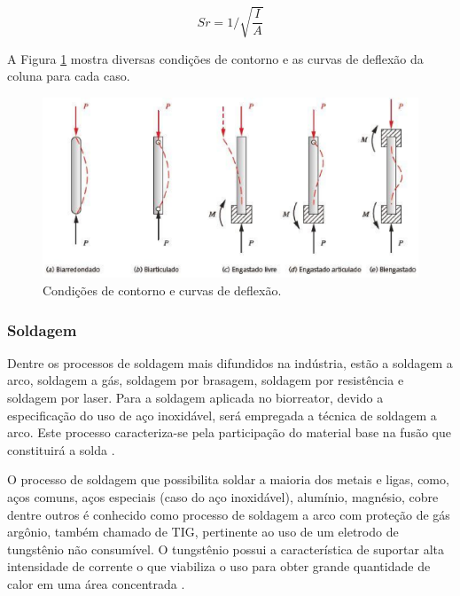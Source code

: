 \[Sr = 1/\sqrt{\frac{I}{A}}\]

A Figura \ref{solda} mostra diversas condições de contorno e as curvas de deflexão da coluna para cada caso.

\begin{figure}[h]
 \centering
 \includegraphics[keepaspectratio=true,scale=0.5]{figuras/solda.eps}
 \caption{Condições de contorno e curvas de deflexão.}
 \label{solda}
\end{figure}

\subsubsection{Soldagem}

Dentre os processos de soldagem mais difundidos na indústria, estão a soldagem a arco, soldagem a gás, soldagem por brasagem, soldagem por resistência e soldagem por laser. Para a soldagem aplicada no biorreator, devido a especificação do uso de aço inoxidável, será empregada a técnica de soldagem a arco. Este processo caracteriza-se pela participação do material base na fusão que constituirá a solda \cite{chiaverini1986tecnologia}.

O processo de soldagem que possibilita soldar a maioria dos metais e ligas, como, aços comuns, aços especiais (caso do aço inoxidável), alumínio, magnésio, cobre dentre outros é conhecido como processo de soldagem a arco com proteção de gás argônio, também chamado de TIG, pertinente ao uso de um eletrodo de tungstênio não consumível. O tungstênio possui a característica de suportar alta intensidade de corrente o que viabiliza o uso para obter grande quantidade de calor em uma área concentrada \cite{chiaverini1986tecnologia}.


